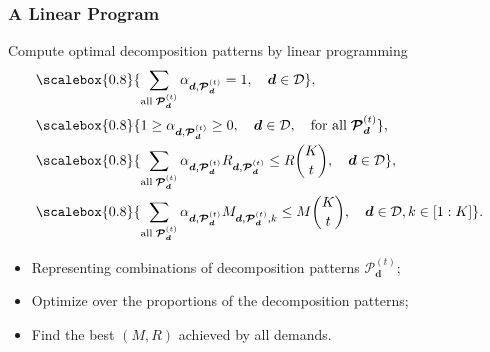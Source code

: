 \documentclass{beamer}
\newcommand\scalemath[2]{\scalebox{#1}{\mbox{\ensuremath{\displaystyle #2}}}}
\begin{document}



\begin{frame}
\frametitle{A Linear Program}
Compute optimal decomposition patterns by linear programming
\begin{align*}
& \scalemath{0.8}{\sum_{\text{all} \; \boldsymbol{\mathcal{P}}_{\boldsymbol{d}}^{(t)}}\alpha_{\boldsymbol{d},\boldsymbol{\mathcal{P}}_{\boldsymbol{d}}^{(t)}}=1, \quad \boldsymbol{d} \in \mathcal{D}}, \\
& \scalemath{0.8}{1 \geq \alpha_{\boldsymbol{d},\boldsymbol{\mathcal{P}}_{\boldsymbol{d}}^{(t)}} \geq 0, \quad \boldsymbol{d} \in \mathcal{D}, \quad \text{for all} \; \boldsymbol{\mathcal{P}}_{\boldsymbol{d}}^{(t)}}, \\
& \scalemath{0.8}{\sum_{\text{all} \; \boldsymbol{\mathcal{P}}_{\boldsymbol{d}}^{(t)} } \alpha_{\boldsymbol{d},\boldsymbol{\mathcal{P}}_{\boldsymbol{d}}^{(t)}} R_{\boldsymbol{d},\boldsymbol{\mathcal{P}}_{\boldsymbol{d}}^{(t)}} \leq R\binom{K}{t}, \quad \boldsymbol{d} \in \mathcal{D}}, \\
& \scalemath{0.8}{\sum_{\text{all} \; \boldsymbol{\mathcal{P}}_{\boldsymbol{d}}^{(t)}} \alpha_{\boldsymbol{d},\boldsymbol{\mathcal{P}}_{\boldsymbol{d}}^{(t)}} M_{\boldsymbol{d},\boldsymbol{\mathcal{P}}_{\boldsymbol{d}}^{(t)},k} \leq M\binom{K}{t}, \quad \boldsymbol{d} \in \mathcal{D}, k \in [1:K]}.
\end{align*}
\begin{itemize}
\item Representing combinations of decomposition patterns $\boldsymbol{\mathcal{P}}_{\boldsymbol{d}}^{(t)}$;
\item Optimize over the proportions of the decomposition patterns;
\item Find the best $(M,R)$ achieved by all demands.
\end{itemize}
\end{frame}
\end{document}
